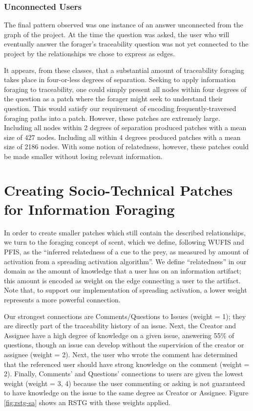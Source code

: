 \documentclass[conference]{IEEEtran}
\begin{document}
\subsubsection{Unconnected Users}
The final pattern observed was one instance of an answer unconnected from the graph of the project. At the time the question was asked, the user who will eventually answer the forager's traceability question was not yet connected to the project by the relationships we chose to express as edges. 

It appears, from these classes, that a substantial amount of traceability foraging takes place in four-or-less degrees of separation. Seeking to apply information foraging to traceability, one could simply present all nodes within four degrees of the question as a patch where the forager might seek to understand their question. This would satisfy our requirement of encoding frequently-traversed foraging paths into a patch. However, these patches are extremely large. Including all nodes within 2 degrees of separation produced patches with a mean size of 427 nodes. Including all within 4 degrees produced patches with a mean size of 2186 nodes. With some notion of relatedness, however, these patches could be made smaller without losing relevant information.

\section{Creating Socio-Technical Patches for Information Foraging}
In order to create smaller patches which still contain the described relationships, we turn to the foraging concept of scent, which we define, following WUFIS and PFIS, as the ``inferred relatedness of a cue to the prey, as measured by amount of activation from a spreading activation algorithm''. We define ``relatedness'' in our domain as the amount of knowledge that a user has on an information artifact; this amount is encoded as weight on the edge connecting a user to the artifact. Note that, to support our implementation of spreading activation, a lower weight represents a more powerful connection.

Our strongest connections are Comments/Questions to Issues (weight = 1); they are directly part of the traceability history of an issue. Next, the Creator and Assignee have a high degree of knowledge on a given issue, answering 55\% of questions, though an issue can develop without the supervision of the creator or assignee (weight = 2). Next, the user who wrote the comment has determined that the referenced user should have strong knowledge on the comment (weight = 2). Finally, Comments' and Questions' connections to users are given the lowest weight (weight = 3, 4) because the user commenting or asking is not guaranteed to have knowledge on the issue to the same degree as Creator or Assignee. Figure \ref{fig:rstg-sa} shows an RSTG with these weights applied.
\end{document}

